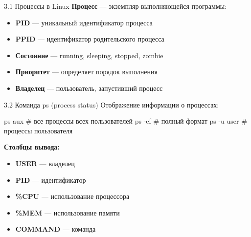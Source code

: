 \documentclass[
  ignorenonframetext,
  aspectratio=169,
  russian,
]{beamer}
\newenvironment{Shaded}{\begin{snugshade}}{\end{snugshade}}
\newcommand{\AttributeTok}[1]{\textcolor[rgb]{0.40,0.45,0.13}{#1}}
\newcommand{\CommentTok}[1]{\textcolor[rgb]{0.37,0.37,0.37}{#1}}
\newcommand{\FunctionTok}[1]{\textcolor[rgb]{0.28,0.35,0.67}{#1}}
\newcommand{\NormalTok}[1]{\textcolor[rgb]{0.00,0.23,0.31}{#1}}
\providecommand{\tightlist}{%
  \setlength{\itemsep}{0pt}\setlength{\parskip}{0pt}}
\begin{document}
\begin{frame}{3.1 Процессы в Linux}
\label{ux43fux440ux43eux446ux435ux441ux441ux44b-ux432-linux}
\textbf{Процесс} --- экземпляр выполняющейся программы:

\begin{itemize}[<+->]
\tightlist
\item
  \textbf{PID} --- уникальный идентификатор процесса
\item
  \textbf{PPID} --- идентификатор родительского процесса
\item
  \textbf{Состояние} --- running, sleeping, stopped, zombie
\item
  \textbf{Приоритет} --- определяет порядок выполнения
\item
  \textbf{Владелец} --- пользователь, запустивший процесс
\end{itemize}
\end{frame}

\begin{frame}[fragile]{3.2 Команда ps (process status)}
\label{ux43aux43eux43cux430ux43dux434ux430-ps-process-status}
Отображение информации о процессах:

\begin{Shaded}
\begin{Highlighting}[]
\FunctionTok{ps}\NormalTok{ aux    }\CommentTok{\# все процессы всех пользователей}
\FunctionTok{ps} \AttributeTok{{-}ef}    \CommentTok{\# полный формат}
\FunctionTok{ps} \AttributeTok{{-}u}\NormalTok{ user }\CommentTok{\# процессы пользователя}
\end{Highlighting}
\end{Shaded}

\textbf{Столбцы вывода:}

\begin{itemize}[<+->]
\tightlist
\item
  \textbf{USER} --- владелец
\item
  \textbf{PID} --- идентификатор
\item
  \textbf{\%CPU} --- использование процессора
\item
  \textbf{\%MEM} --- использование памяти
\item
  \textbf{COMMAND} --- команда
\end{itemize}
\end{frame}
\end{document}
